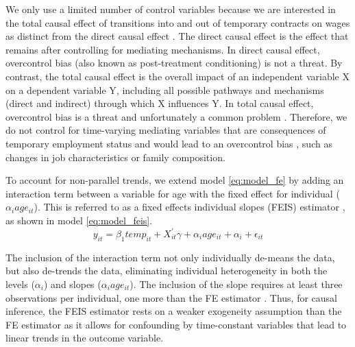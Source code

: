 \documentclass[12pt]{article}
\begin{document}
We only use a limited number of control variables because we are interested in the total causal effect of transitions into and out of temporary contracts on wages as distinct from the direct causal effect \citep{elwert_endogenous_2014}.  The direct causal effect is the effect that remains after controlling for mediating mechanisms.  In direct causal effect, overcontrol bias (also known as post-treatment conditioning) is not a threat.  By contrast, the total causal effect is the overall impact of an independent variable X on a dependent variable Y, including all possible pathways and mechanisms (direct and indirect) through which X influences Y.  In total causal effect, overcontrol bias is a threat and unfortunately a common problem \citep{lundberg_what_2021}.  Therefore, we do not control for time-varying mediating variables that are consequences of temporary employment status and would lead to an overcontrol bias  \citep{ludwig_what_2021}, such as changes in job characteristics or family composition.

To account for non-parallel trends, we extend model \ref{eq:model_fe} by adding an interaction term between a variable for age with the fixed effect for individual ($\alpha_i age_{it}$).  This is referred to as a fixed effects individual slopes (FEIS) estimator  \citep{ludwig_is_2018}, as shown in model \ref{eq:model_feis}.  
\begin{equation}
    y_{it} = \beta_1 temp_{it} + X^\prime_{it} \gamma + \alpha_i age_{it} + \alpha_i + \epsilon_{it}
    \label{eq:model_feis}
\end{equation}

The inclusion of the interaction term not only individually de-means the data, but also de-trends the data, eliminating individual heterogeneity in both the levels ($\alpha_i$) and slopes ($\alpha_i age_{it}$).  The inclusion of the slope requires at least three observations per individual, one more than the FE estimator \citep{ruttenauer_fixed_2020}.  Thus, for causal inference, the FEIS estimator rests on a weaker exogeneity assumption than the FE estimator as it allows for confounding by time-constant variables that lead to linear trends in the outcome variable. 
\end{document}
